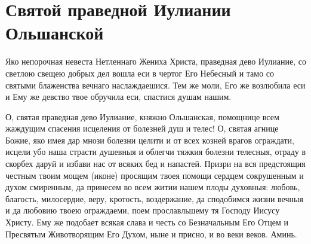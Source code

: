 \section{Святой праведной Иулиании Ольшанской}\begin{mymulticols}


Яко непорочная невеста Нетленнаго Жениха Христа, праведная дево Иулиание,  со светлою свещею добрых дел вошла еси в чертог Его Небесный и тамо со святыми блаженства вечнаго наслаждаешися. Тем же моли, Его же возлюбила еси и Ему же девство твое обручила еси, спастися душам нашим.


О, святая праведная дево Иулиание, княжно Ольшанская, помощнице всем жаждущим спасения исцеления от болезней душ и телес! О, святая агнице Божие, яко имея дар мнози болезни целити и от всех козней врагов ограждати, исцели убо наша страсти душевныя и облегчи тяжкия болезни телесныя, отраду в скорбех даруй и избави нас от всяких бед и напастей. Призри на вся предстоящия честным твоим мощем (иконе) просящим твоея помощи сердцем сокрушенным и духом смиренным, да принесем во всем житии нашем плоды духовныя: любовь, благость, милосердие, веру, кротость, воздержание, да сподобимся жизни вечныя и да любовию твоею ограждаеми, поем прославльшему тя Господу Иисусу Христу. Ему же подобает всякая слава и честь со Безначальным Его Отцем и Пресвятым Животворящим Его Духом, ныне и присно, и во веки веков. Аминь.

\end{mymulticols}

\mychapterending


